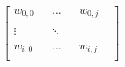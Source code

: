 \documentclass[10pt]{article}
\begin{document}
\begin{align*}\begin{bmatrix}
w_{0,0} & & \dots & & w_{0,j}\\
& & & & & \\
\vdots & & \ddots & & & \\
& & & & & \\
w_{i,0} & & \dots & & w_{i,j}\\
\end{bmatrix}
\end{align*}
\end{document}
